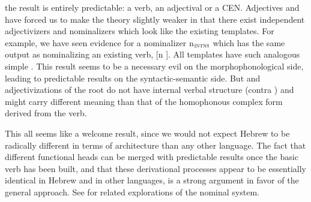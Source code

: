\begin{exe}
\begin{xlist}
\begin{exe}
\begin{xlist}
\begin{exe}
\begin{exe}
\begin{xlist}
\begin{exe}
\begin{exe}
\begin{xlist}
\begin{exe}
\begin{xlist}
\begin{exe}
\begin{xlist}
\begin{exe}
\begin{xlist}
\begin{exe}
\begin{xlist}
\begin{xlist}
\begin{exe}
\begin{xlist}
\begin{exe}
\begin{xlist}
\begin{exe}
\begin{exe}
\begin{exe}
\begin{xlist}
\begin{exe}
\begin{exe}
\begin{xlist}
\begin{exe}
\begin{xlist}
\begin{exe}
\begin{xlist}
\begin{exe}
\begin{xlist}
\begin{xlist}
\begin{exe}
\begin{xlist}
\begin{exe}
\begin{xlist}
\begin{exe}
\begin{xlist}
\begin{exe}
\begin{xlist}
\begin{exe}
\begin{exe}
\begin{exe}
\begin{exe}
\begin{exe}
\begin{xlist}
\begin{xlist}
\begin{exe}
\begin{xlist}
\begin{exe}
\begin{xlist}
\begin{exe}
\begin{exe}
\begin{exe}
\begin{xlist}
\begin{exe}
\begin{xlist}
\begin{exe}
\begin{xlist}
\begin{exe}
\begin{exe}
\begin{xlist}
\begin{exe}
\begin{exe}
\begin{exe}
\begin{xlist}
\begin{xlist}
\begin{exe}
\begin{exe}
\begin{exe}
\begin{xlist}
\begin{exe}
\begin{xlist}
the result is entirely predictable: a  verb, an adjectival  or a CEN. Adjectives and  have forced us to make the theory slightly weaker in that there exist independent adjectivizers and nominalizers which look like the existing templates. For example, we have seen evidence for a nominalizer n$_{\gsc{INTNS}}$ which has the same output as nominalizing an existing verb, [n \tpie]. All templates have such analogous simple . This result seems to be a necessary evil on the morphophonological side, leading to predictable results on the syntactic-semantic side. But  and adjectivizations of the root do not have internal verbal structure (contra \citealt{borer13oup,borer14lingua}) and might carry different meaning than that of the homophonous complex form derived from the verb.

This all seems like a welcome result, since we would not expect Hebrew to be radically different in terms of architecture than any other language. The fact that different functional heads can be merged with predictable results once the basic verb has been built, and that these derivational processes appear to be essentially identical in Hebrew and in other languages, is a strong argument in favor of the general approach. See \cite{ahdout19phd} for related explorations of the nominal system.\label{r1:5:7}


\end{xlist}
\end{exe}
\end{xlist}
\end{exe}
\end{exe}
\end{exe}
\end{xlist}
\end{xlist}
\end{exe}
\end{exe}
\end{exe}
\end{xlist}
\end{exe}
\end{exe}
\end{xlist}
\end{exe}
\end{xlist}
\end{exe}
\end{xlist}
\end{exe}
\end{exe}
\end{exe}
\end{xlist}
\end{exe}
\end{xlist}
\end{exe}
\end{xlist}
\end{xlist}
\end{exe}
\end{exe}
\end{exe}
\end{exe}
\end{exe}
\end{xlist}
\end{exe}
\end{xlist}
\end{exe}
\end{xlist}
\end{exe}
\end{xlist}
\end{exe}
\end{xlist}
\end{xlist}
\end{exe}
\end{xlist}
\end{exe}
\end{xlist}
\end{exe}
\end{xlist}
\end{exe}
\end{exe}
\end{xlist}
\end{exe}
\end{exe}
\end{exe}
\end{xlist}
\end{exe}
\end{xlist}
\end{exe}
\end{xlist}
\end{xlist}
\end{exe}
\end{xlist}
\end{exe}
\end{xlist}
\end{exe}
\end{xlist}
\end{exe}
\end{xlist}
\end{exe}
\end{exe}
\end{xlist}
\end{exe}
\end{exe}
\end{xlist}
\end{exe}
\end{xlist}
\end{exe}
